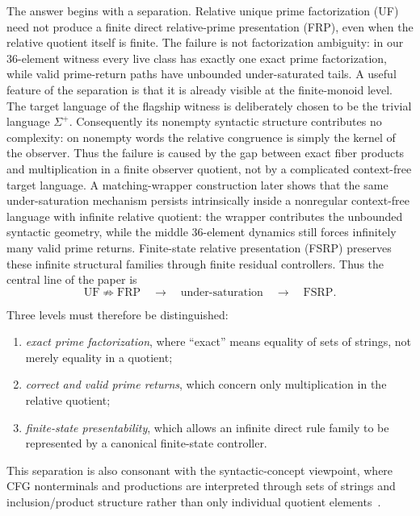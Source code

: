 \documentclass[11pt,a4paper]{article}
\begin{document}
The answer begins with a separation.  Relative unique prime factorization (UF) need not produce a finite direct relative-prime presentation (FRP), even when the relative quotient itself is finite.  The failure is not factorization ambiguity: in our $36$-element witness every live class has exactly one exact prime factorization, while valid prime-return paths have unbounded under-saturated tails.  A useful feature of the separation is that it is already visible at the finite-monoid level.  The target language of the flagship witness is deliberately chosen to be the trivial language $\Sigma^+$.  Consequently its nonempty syntactic structure contributes no complexity: on nonempty words the relative congruence is simply the kernel of the observer.  Thus the failure is caused by the gap between exact fiber products and multiplication in a finite observer quotient, not by a complicated context-free target language.  A matching-wrapper construction later shows that the same under-saturation mechanism persists intrinsically inside a nonregular context-free language with infinite relative quotient: the wrapper contributes the unbounded syntactic geometry, while the middle $36$-element dynamics still forces infinitely many valid prime returns.  Finite-state relative presentation (FSRP) preserves these infinite structural families through finite residual controllers.  Thus the central line of the paper is
\[
  \mathrm{UF}\not\Rightarrow\mathrm{FRP}
  \quad\longrightarrow\quad
  \text{under-saturation}
  \quad\longrightarrow\quad
  \mathrm{FSRP}.
\]

Three levels must therefore be distinguished:
\begin{enumerate}[label=(\roman*)]
\item \emph{exact prime factorization}, where ``exact'' means equality of sets of strings, not merely equality in a quotient;
\item \emph{correct and valid prime returns}, which concern only multiplication in the relative quotient;
\item \emph{finite-state presentability}, which allows an infinite direct rule family to be represented by a canonical finite-state controller.
\end{enumerate}
This separation is also consonant with the syntactic-concept viewpoint, where CFG nonterminals and productions are interpreted through sets of strings and inclusion/product structure rather than only individual quotient elements~\cite{Clark2015SCL}.
\end{document}

